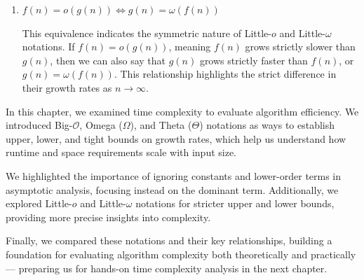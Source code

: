 \begin{enumerate}
    \item \( f(n) = o(g(n)) \Leftrightarrow g(n) = \omega(f(n)) \)
    
    This equivalence indicates the symmetric nature of Little-\(o\) and Little-\(\omega\) notations. If \( f(n) = o(g(n)) \), meaning \( f(n) \) grows strictly slower than \( g(n) \), then we can also say that \( g(n) \) grows strictly faster than \( f(n) \), or \( g(n) = \omega(f(n)) \). This relationship highlights the strict difference in their growth rates as \( n \to \infty \).
\end{enumerate}

In this chapter, we examined time complexity to evaluate algorithm efficiency. We introduced Big-$\mathcal{O}$, Omega ($\Omega$), and Theta ($\Theta$) notations as ways to establish upper, lower, and tight bounds on growth rates, which help us understand how runtime and space requirements scale with input size.

We highlighted the importance of ignoring constants and lower-order terms in asymptotic analysis, focusing instead on the dominant term. Additionally, we explored Little-$o$ and Little-$\omega$ notations for stricter upper and lower bounds, providing more precise insights into complexity.

Finally, we compared these notations and their key relationships, building a foundation for evaluating algorithm complexity both theoretically and practically — preparing us for hands-on time complexity analysis in the next chapter.
